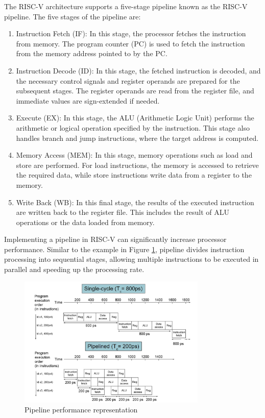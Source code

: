             The RISC-V architecture supports a five-stage pipeline known as the RISC-V pipeline. The five stages of the pipeline are:
            \begin{enumerate}
            \item Instruction Fetch (IF): In this stage, the processor fetches the instruction from memory. The program counter (PC) is used to fetch the instruction from the memory address pointed to by the PC.
            \item Instruction Decode (ID): In this stage, the fetched instruction is decoded, and the necessary control signals and register operands are prepared for the subsequent stages. The register operands are read from the register file, and immediate values are sign-extended if needed.
            \item Execute (EX): In this stage, the ALU (Arithmetic Logic Unit) performs the arithmetic or logical operation specified by the instruction. This stage also handles branch and jump instructions, where the target address is computed.
            \item Memory Access (MEM): In this stage, memory operations such as load and store are performed. For load instructions, the memory is accessed to retrieve the required data, while store instructions write data from a register to the memory.
            \item Write Back (WB): In this final stage, the results of the executed instruction are written back to the register file. This includes the result of ALU operations or the data loaded from memory.
            
            \end{enumerate}
            
            Implementing a pipeline in RISC-V can significantly increase processor performance. Similar to the example in Figure \ref{pipe2}, pipeline divides instruction processing into sequential stages, allowing multiple instructions to be executed in parallel and speeding up the processing rate.
            
            \begin{figure}[!h]
            \centering
            \includegraphics[width=0.8\textwidth]{figures/riscv/pipe2.jpg}
                \caption{\label{pipe2} Pipeline performance representation }
            \end{figure}

